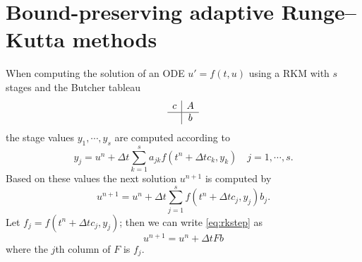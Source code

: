 \documentclass[a4paper]{article}
\numberwithin{equation}{section}
\theoremstyle{plain}
\theoremstyle{definition}
\numberwithin{theorem}{section}
\newcommand{\dt}{{\Delta t}}
\newcommand{\1}{\mathbbm{1}}
\begin{document}
\section{Bound-preserving adaptive Runge--Kutta methods}\label{sec:main_idea}

When computing the solution of an ODE $u ' = f(t,u) $ using a RKM with $s$ stages and the Butcher tableau
\begin{align}
\begin{array}{c|c}
c &  A \\
\hline
 & b\\
\end{array}
\end{align}
the stage values $y_1,\cdots,y_s$ are computed according to
\begin{equation}
y_j =  u^n + \dt \sum_{k = 1}^{s} a_{jk} f(t^n + \dt c_k,y_k)  \quad j = 1,\cdots,s.
\end{equation}
Based on these values the next solution $u^{n+1}$ is computed by
\begin{equation} \label{eq:rkstep}
u^{n+1} = u^n + \dt \sum_{j  = 1}^s f(t^n + \dt c_j,y_j) b_j .
\end{equation}
Let $f_j = f(t^n + \dt c_j,y_j)$; then we can write \eqref{eq:rkstep} as
\begin{equation}\label{eq:Combination}
u^{n+1} = u^n + \dt F b
\end{equation}
where the $j$th column of $F$ is $f_j$.
\end{document}
